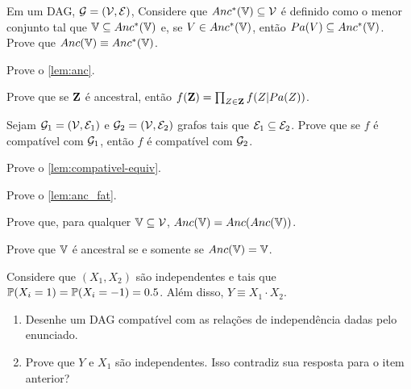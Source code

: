 \begin{exercise}
 Em um DAG, $\sG = (\sV, \sE)$,
 Considere que $Anc^*(\V) \subseteq \sV$ é
 definido como o menor conjunto tal que
 $\V \subseteq Anc^*(\V)$ e,
 se $V \in Anc^*(\V)$, então
 $Pa(V) \subseteq Anc^*(\V)$.
 Prove que $Anc(\V) \equiv Anc^*(\V)$.
\end{exercise}

\begin{exercise} 
 Prove o \cref{lem:anc}.
\end{exercise}

\begin{exercise}
 \label{lemma:anc_fact}
 Prove que se $\Z$ é ancestral, então
 $f(\Z) = \prod_{Z \in \Z}f(Z|Pa(Z))$. 
\end{exercise}

\begin{exercise}
 Sejam $\sG_1 = (\sV, \sE_1)$ e
 $\sG_2 = (\sV, \sE_2)$ grafos
 tais que $\sE_1 \subseteq \sE_2$.
 Prove que se 
 $f$ é compatível com $\sG_1$, então 
 $f$ é compatível com $\sG_2$.
\end{exercise}

\begin{exercise}
 Prove o \cref{lem:compativel-equiv}.
\end{exercise}

\begin{exercise}
 Prove o \cref{lem:anc_fat}.
\end{exercise}

\begin{exercise}
 Prove que, para qualquer $\V \subseteq \sV$,
 $Anc(\V) = Anc(Anc(\V))$.
\end{exercise}

\begin{exercise}
 Prove que $\V$ é ancestral se e somente se
 $Anc(\V) = \V$.
\end{exercise}

\begin{exercise}
 \label{ex:infiel}
 Considere que $(X_1,X_2)$ são independentes e
 tais que $\P(X_i=1)=\P(X_i=-1)=0.5$.
 Além disso, $Y \equiv X_1 \cdot X_2$.
 \begin{enumerate}[label=(\alph*)]
  \item Desenhe um DAG compatível
  com as relações de independência dadas pelo enunciado.
  \item Prove que $Y$ e $X_1$ são independentes.
  Isso contradiz sua resposta para o item anterior?
 \end{enumerate}
\end{exercise}

